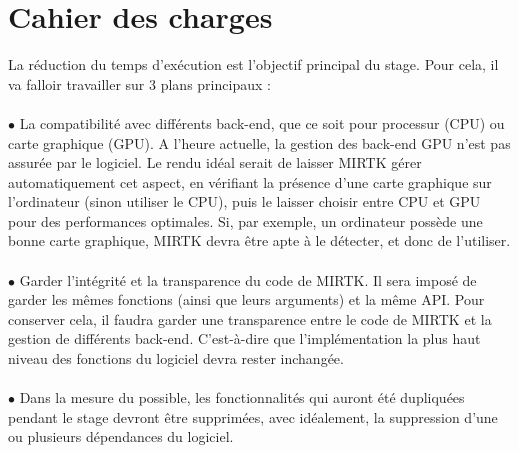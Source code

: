 \documentclass[10pt]{report}
\begin{document}
	\section{Cahier des charges}
	La réduction du temps d'exécution est l'objectif principal du stage. Pour cela, il va falloir travailler sur 3 plans principaux : \\
	\\{$\bullet$} La compatibilité avec différents back-end, que ce soit pour processur (CPU) ou carte graphique (GPU). A l'heure actuelle, la gestion des back-end GPU n'est pas assurée par le logiciel. Le rendu idéal serait de laisser MIRTK gérer automatiquement cet aspect, en vérifiant la présence d'une carte graphique sur l'ordinateur (sinon utiliser le CPU), puis le laisser choisir entre CPU et GPU pour des performances optimales. Si, par exemple, un ordinateur possède une bonne carte graphique, MIRTK devra être apte à le détecter, et donc de l'utiliser.\\
	\\{$\bullet$} Garder l'intégrité et la transparence du code de MIRTK. Il sera imposé de garder les mêmes fonctions (ainsi que leurs arguments) et la même API. Pour conserver cela, il faudra garder une transparence entre le code de MIRTK et la gestion de différents back-end. C'est-à-dire que l'implémentation la plus haut niveau des fonctions du logiciel devra rester inchangée.\\
	\\{$\bullet$} Dans la mesure du possible, les fonctionnalités qui auront été dupliquées pendant le stage devront être supprimées, avec idéalement, la suppression d'une ou plusieurs dépendances du logiciel.
	
	
\end{document}
